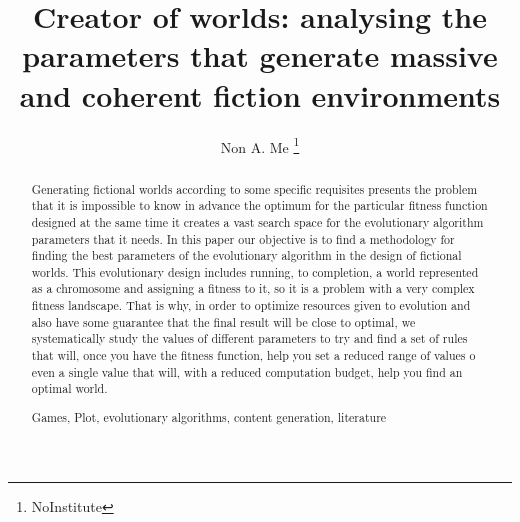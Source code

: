 \documentclass[runningheads,a4paper]{llncs}
\newcommand{\keywords}[1]{\par\addvspace\baselineskip
\noindent\keywordname\enspace\ignorespaces#1}
\begin{document}
\mainmatter  %

\title{Creator of worlds: analysing the parameters that generate massive and coherent fiction environments}


%
%
\author{Non A. Me%
\thanks{NoInstitute}}
%


%
%

\maketitle


\begin{abstract}
Generating fictional worlds according to some specific requisites
presents the problem that it is impossible to know in advance the optimum for the
particular fitness function designed at the same time it creates a
vast search space for the evolutionary algorithm parameters that it
needs. In this paper our objective is to find a methodology for finding the
best parameters of the evolutionary algorithm in the design of
fictional worlds. This evolutionary design includes running, to
completion, a world represented as a chromosome and assigning a fitness to it, so it is a problem
with a very complex fitness landscape. That is why, in order to
optimize resources given to evolution and also have some guarantee
that the final result will be close to optimal, we systematically
study the values of different parameters to try and find a set of
rules that will, once you have the fitness function, help you set a
reduced range of values o even a single value that will, with a
reduced computation budget, help you find an optimal world.

\keywords{Games, Plot, evolutionary algorithms, content generation, literature}
\end{abstract}
\end{document}
